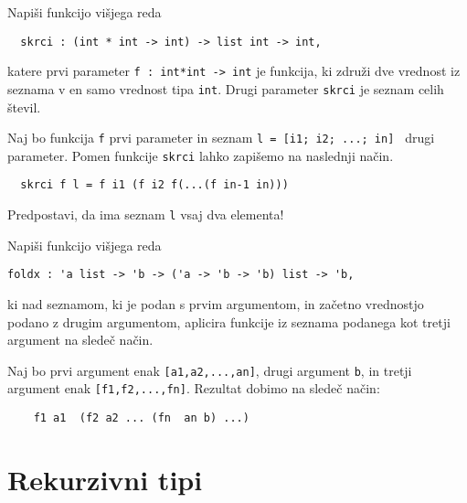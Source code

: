 \begin{ex}
  Napi\v si funkcijo vi\v sjega reda

  \begin{lstlisting}
  skrci : (int * int -> int) -> list int -> int,
  \end{lstlisting}
  katere prvi parameter \lstinline{f : int*int -> int} je funkcija, ki
  zdru\v zi dve vrednost iz seznama v en samo vrednost tipa
  \lstinline{int}. Drugi parameter \lstinline{skrci} je seznam celih \v
  stevil.

  Naj bo funkcija \lstinline{f} prvi parameter in seznam \lstinline{l = [i1; i2; ...; in] } drugi parameter. Pomen funkcije \lstinline{skrci}
  lahko zapi\v semo na naslednji na\v cin.

  \begin{lstlisting}
  skrci f l = f i1 (f i2 f(...(f in-1 in)))
  \end{lstlisting}
  Predpostavi, da ima seznam \lstinline{l} vsaj dva elementa!
\end{ex}



\begin{ex}
Napi\v si funkcijo vi\v sjega reda 

\begin{lstlisting}
foldx : 'a list -> 'b -> ('a -> 'b -> 'b) list -> 'b,
\end{lstlisting}
ki nad seznamom, ki je podan s prvim argumentom, in za\v cetno vrednostjo podano z drugim argumentom, aplicira funkcije iz seznama podanega kot tretji argument na slede\v c na\v cin. 

Naj bo prvi argument enak \lstinline{[a1,a2,...,an]},
drugi argument \lstinline{b}, in tretji argument enak
\lstinline{[f1,f2,...,fn]}. 
Rezultat dobimo na slede\v c na\v cin: 
\begin{lstlisting}
    f1 a1  (f2 a2 ... (fn  an b) ...)
\end{lstlisting}


\end{ex} 






\section{Rekurzivni tipi}





